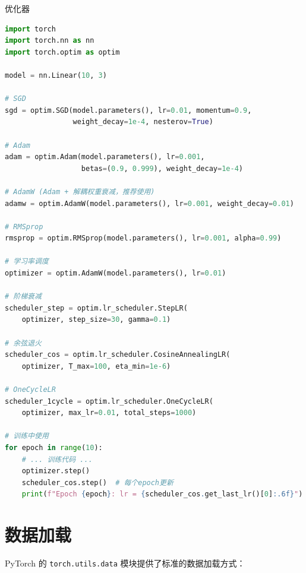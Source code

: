 \begin{mycode}{优化器}
\begin{lstlisting}[language=Python]
import torch
import torch.nn as nn
import torch.optim as optim

model = nn.Linear(10, 3)

# SGD
sgd = optim.SGD(model.parameters(), lr=0.01, momentum=0.9,
                weight_decay=1e-4, nesterov=True)

# Adam
adam = optim.Adam(model.parameters(), lr=0.001,
                  betas=(0.9, 0.999), weight_decay=1e-4)

# AdamW (Adam + 解耦权重衰减，推荐使用)
adamw = optim.AdamW(model.parameters(), lr=0.001, weight_decay=0.01)

# RMSprop
rmsprop = optim.RMSprop(model.parameters(), lr=0.001, alpha=0.99)

# 学习率调度
optimizer = optim.AdamW(model.parameters(), lr=0.01)

# 阶梯衰减
scheduler_step = optim.lr_scheduler.StepLR(
    optimizer, step_size=30, gamma=0.1)

# 余弦退火
scheduler_cos = optim.lr_scheduler.CosineAnnealingLR(
    optimizer, T_max=100, eta_min=1e-6)

# OneCycleLR
scheduler_1cycle = optim.lr_scheduler.OneCycleLR(
    optimizer, max_lr=0.01, total_steps=1000)

# 训练中使用
for epoch in range(10):
    # ... 训练代码 ...
    optimizer.step()
    scheduler_cos.step()  # 每个epoch更新
    print(f"Epoch {epoch}: lr = {scheduler_cos.get_last_lr()[0]:.6f}")
\end{lstlisting}
\end{mycode}

\section{数据加载}

PyTorch 的 \texttt{torch.utils.data} 模块提供了标准的数据加载方式：


